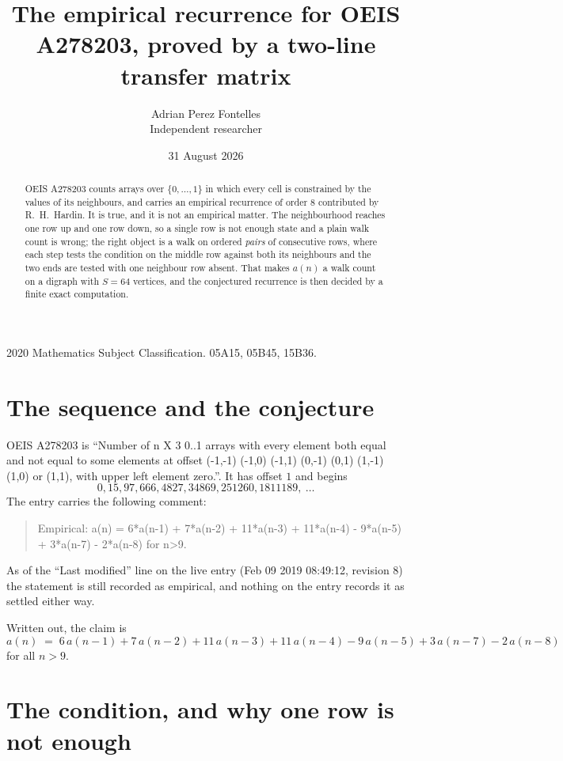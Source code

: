 \documentclass[11pt,a4paper]{article}
\title{The empirical recurrence for OEIS A278203, proved by a two-line transfer matrix}
\author{Adrian Perez Fontelles\\ \small Independent researcher}
\date{31 August 2026}
\theoremstyle{plain}
\theoremstyle{definition}
\begin{document}
\maketitle

\begin{abstract}
OEIS A278203 counts arrays over $\{0,\dots,1\}$ in which every cell is constrained by the
values of its neighbours, and carries an empirical recurrence of order $8$ contributed
by R.~H.~Hardin. It is true, and it is not an empirical matter. The neighbourhood reaches one
row up and one row down, so a single row is not enough state and a plain walk count
is wrong; the right object is a walk on ordered \emph{pairs} of consecutive rows, where
each step tests the condition on the middle row against both its neighbours and the two
ends are tested with one neighbour row absent. That makes $a(n)$ a walk count on a digraph
with $S=64$ vertices, and the conjectured recurrence is then decided by a finite exact
computation.
\end{abstract}

\noindent\small 2020 Mathematics Subject Classification. 05A15, 05B45, 15B36.\normalsize

\section{The sequence and the conjecture}

OEIS A278203 is ``Number of n X 3 0..1 arrays with every element both equal and not equal to some elements at offset (-1,-1) (-1,0) (-1,1) (0,-1) (0,1) (1,-1) (1,0) or (1,1), with upper left element zero.''. It has offset $1$ and begins
\[
0, 15, 97, 666, 4827, 34869, 251260, 1811189,\ \dots
\]
The entry carries the following comment:
\begin{quote}\small
Empirical: a(n) = 6*a(n-1) + 7*a(n-2) + 11*a(n-3) + 11*a(n-4) - 9*a(n-5) + 3*a(n-7) - 2*a(n-8) for n>9.
\end{quote}
As of the ``Last modified'' line on the live entry (Feb 09 2019 08:49:12, revision 8) the statement is
still recorded as empirical, and nothing on the entry records it as settled either way.

Written out, the claim is
\begin{equation}\label{eq:conj}
a(n)\;=\;6\,a(n-1) + 7\,a(n-2) + 11\,a(n-3) + 11\,a(n-4) - 9\,a(n-5) + 3\,a(n-7) - 2\,a(n-8)
\end{equation}
for all $n>9$.

\section{The condition, and why one row is not enough}
\end{document}
